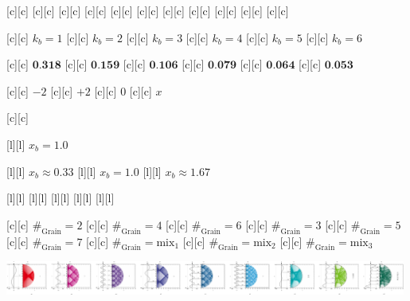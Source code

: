  [c][c] {}
 [c][c] {}
 [c][c] {}
 [c][c] {}
 [c][c] {}
[c][c] {}
[c][c] {}
[c][c] {}
[c][c] {}
[c][c] {}
[c][c] {}



[c][c] {\tiny $k_{b} = 1$}
[c][c] {\tiny $k_{b} = 2$}
[c][c] {\tiny $k_{b} = 3$}
[c][c] {\tiny $k_{b} = 4$}
[c][c] {\tiny $k_{b} = 5$}
[c][c] {\tiny $k_{b} = 6$}

[c][c] {\tiny $\textbf{0.318}$}
[c][c] {\tiny $\textbf{0.159}$}
[c][c] {\tiny $\textbf{0.106}$}
[c][c] {\tiny $\textbf{0.079}$}
[c][c] {\tiny $\textbf{0.064}$}
[c][c] {\tiny $\textbf{0.053}$}

[c][c] {\tiny $-2$}
[c][c] {\tiny $+2$}
[c][c]   {\tiny $0$}
[c][c]   {\tiny $x$}

[c][c]  {}

[l][l] {\tiny $x_{b} = 1.0$}

[l][l] {\tiny $x_{b} \approx 0.33$}
[l][l] {\tiny $x_{b} = 1.0$}
[l][l] {\tiny $x_{b} \approx 1.67$}

[l][l] {}
[l][l] {}
[l][l] {}
[l][l] {}
[l][l] {}

[c][c] {\footnotesize $\#_{\text{Grain}}=2$}
[c][c] {\footnotesize $\#_{\text{Grain}}=4$}
[c][c] {\footnotesize $\#_{\text{Grain}}=6$}
[c][c] {\footnotesize $\#_{\text{Grain}}=3$}
[c][c] {\footnotesize $\#_{\text{Grain}}=5$}
[c][c] {\footnotesize $\#_{\text{Grain}}=7$}
[c][c] {\footnotesize $\#_{\text{Grain}}=\text{mix}_1$}
[c][c] {\footnotesize $\#_{\text{Grain}}=\text{mix}_2$}
[c][c] {\footnotesize $\#_{\text{Grain}}=\text{mix}_3$}

\includegraphics[width=0.99\textwidth]{characsin_rotate_semicircle_135246mix_horizontal.eps}